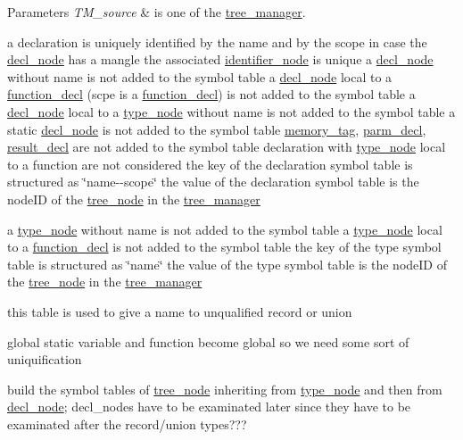 \begin{DoxyParams}{Parameters}
{\em T\+M\+\_\+source} & is one of the \hyperlink{classtree__manager}{tree\+\_\+manager}. \\
\hline
\end{DoxyParams}
a declaration is uniquely identified by the name and by the scope in case the \hyperlink{structdecl__node}{decl\+\_\+node} has a mangle the associated \hyperlink{structidentifier__node}{identifier\+\_\+node} is unique a \hyperlink{structdecl__node}{decl\+\_\+node} without name is not added to the symbol table a \hyperlink{structdecl__node}{decl\+\_\+node} local to a \hyperlink{structfunction__decl}{function\+\_\+decl} (scpe is a \hyperlink{structfunction__decl}{function\+\_\+decl}) is not added to the symbol table a \hyperlink{structdecl__node}{decl\+\_\+node} local to a \hyperlink{structtype__node}{type\+\_\+node} without name is not added to the symbol table a static \hyperlink{structdecl__node}{decl\+\_\+node} is not added to the symbol table \hyperlink{structmemory__tag}{memory\+\_\+tag}, \hyperlink{structparm__decl}{parm\+\_\+decl}, \hyperlink{structresult__decl}{result\+\_\+decl} are not added to the symbol table declaration with \hyperlink{structtype__node}{type\+\_\+node} local to a function are not considered the key of the declaration symbol table is structured as \char`\"{}name-\/-\/scope\char`\"{} the value of the declaration symbol table is the node\+ID of the \hyperlink{classtree__node}{tree\+\_\+node} in the \hyperlink{classtree__manager}{tree\+\_\+manager}

a \hyperlink{structtype__node}{type\+\_\+node} without name is not added to the symbol table a \hyperlink{structtype__node}{type\+\_\+node} local to a \hyperlink{structfunction__decl}{function\+\_\+decl} is not added to the symbol table the key of the type symbol table is structured as \char`\"{}name\char`\"{} the value of the type symbol table is the node\+ID of the \hyperlink{classtree__node}{tree\+\_\+node} in the \hyperlink{classtree__manager}{tree\+\_\+manager}

this table is used to give a name to unqualified record or union

global static variable and function become global so we need some sort of uniquification

build the symbol tables of \hyperlink{classtree__node}{tree\+\_\+node} inheriting from \hyperlink{structtype__node}{type\+\_\+node} and then from \hyperlink{structdecl__node}{decl\+\_\+node}; decl\+\_\+nodes have to be examinated later since they have to be examinated after the record/union types???

